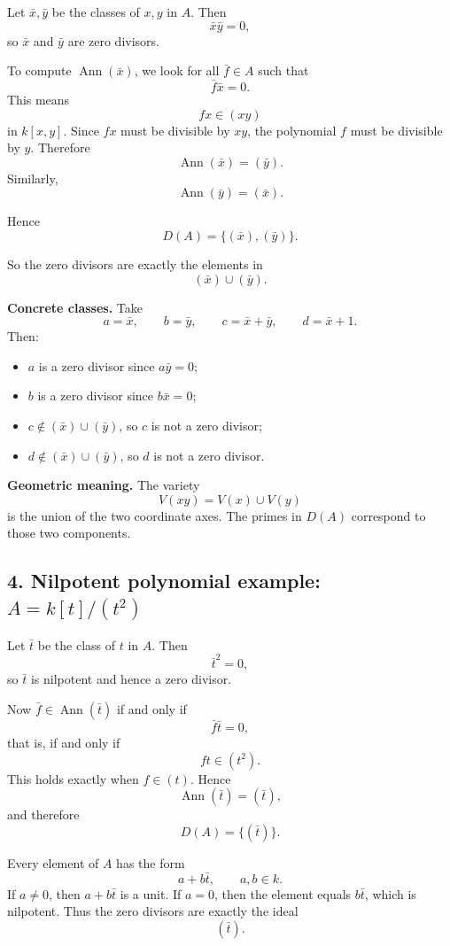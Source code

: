 \documentclass[12pt,a4paper,oneside]{report}
\DeclareMathOperator{\Ann}{Ann}
\theoremstyle{notespace}
\begin{document}
Let \(\bar x,\bar y\) be the classes of \(x,y\) in \(A\). Then
\[
\bar x\bar y=0,
\]
so \(\bar x\) and \(\bar y\) are zero divisors.

To compute \(\Ann(\bar x)\), we look for all \(\bar f\in A\) such that
\[
\bar f\bar x=0.
\]
This means
\[
fx\in (xy)
\]
in \(k[x,y]\). Since \(fx\) must be divisible by \(xy\), the polynomial \(f\) must be divisible by \(y\). Therefore
\[
\Ann(\bar x)=(\bar y).
\]
Similarly,
\[
\Ann(\bar y)=(\bar x).
\]

Hence
\[
D(A)=\{(\bar x),(\bar y)\}.
\]

So the zero divisors are exactly the elements in
\[
(\bar x)\cup(\bar y).
\]

\medskip

\noindent
\textbf{Concrete classes.}
Take
\[
a=\bar x,\qquad b=\bar y,\qquad c=\bar x+\bar y,\qquad d=\bar x+1.
\]
Then:
\begin{itemize}
	\item \(a\) is a zero divisor since \(a\bar y=0\);
	\item \(b\) is a zero divisor since \(b\bar x=0\);
	\item \(c\notin (\bar x)\cup(\bar y)\), so \(c\) is not a zero divisor;
	\item \(d\notin (\bar x)\cup(\bar y)\), so \(d\) is not a zero divisor.
\end{itemize}

\medskip

\noindent
\textbf{Geometric meaning.}
The variety
\[
V(xy)=V(x)\cup V(y)
\]
is the union of the two coordinate axes. The primes in \(D(A)\) correspond to those two components.

\subsection{4. Nilpotent polynomial example: \(A=k[t]/(t^2)\)}

Let \(\bar t\) be the class of \(t\) in \(A\). Then
\[
\bar t^2=0,
\]
so \(\bar t\) is nilpotent and hence a zero divisor.

Now \(\bar f\in \Ann(\bar t)\) if and only if
\[
\bar f\bar t=0,
\]
that is, if and only if
\[
ft\in (t^2).
\]
This holds exactly when \(f\in (t)\). Hence
\[
\Ann(\bar t)=(\bar t),
\]
and therefore
\[
D(A)=\{(\bar t)\}.
\]

Every element of \(A\) has the form
\[
a+b\bar t,\qquad a,b\in k.
\]
If \(a\neq 0\), then \(a+b\bar t\) is a unit. If \(a=0\), then the element equals \(b\bar t\), which is nilpotent. Thus the zero divisors are exactly the ideal
\[
(\bar t).
\]
\end{document}
